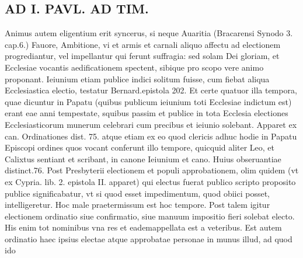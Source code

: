 \documentclass{article}
\begin{document}
\begin{pages}
\section*{AD I. PAVL. AD TIM. }
\marginpar{[ p.338 ]}\pstart Animus autem eligentium erit syncerus, si neque Auaritia (Bracarensi Synodo 3. cap.6.) Fauore, Ambitione, vi et armis et carnali aliquo affectu ad electionem progrediantur, vel impellantur qui ferunt suffragia: sed solam Dei gloriam, et Ecclesiae vocantis aedificationem spectent, sibique pro scopo vere animo proponant. Ieiunium etiam publice indici solitum fuisse, cum fiebat aliqua Ecclesiastica electio, testatur Bernard.epistola 202. Et certe quatuor illa tempora, quae dicuntur in Papatu (quibus publicum ieiunium toti Ecclesiae indictum est) erant eae anni tempestate, squibus passim et publice in tota Ecclesia electiones Ecclesiasticorum munerum celebrari cum precibus et ieiunio solebant. Apparet ex can. Ordinationes dist. 75. atque etiam ex eo quod clericis adhuc hodie in Papatu Episcopi ordines quos vocant conferunt illo tempore, quicquid aliter Leo, et Calixtus sentiant et scribant, in canone Ieiunium et cano. Huius obseruantiae distinct.76. Post Presbyterii electionem et populi approbationem, olim quidem (vt ex Cypria. lib. 2. epistola II. apparet) qui electus fuerat publico scripto proposito publice significabatur, vt si quod esset impedimentum, quod obiici posset, intelligeretur. Hoc male praetermissum est hoc tempore. Post talem igitur electionem ordinatio siue confirmatio, siue manuum impositio fieri solebat electo. His enim tot nominibus vna res et eademappellata est a veteribus. Est autem ordinatio haec ipsius electae atque approbatae personae in munus illud, ad quod ido\pend

\end{pages}
\end{document}
